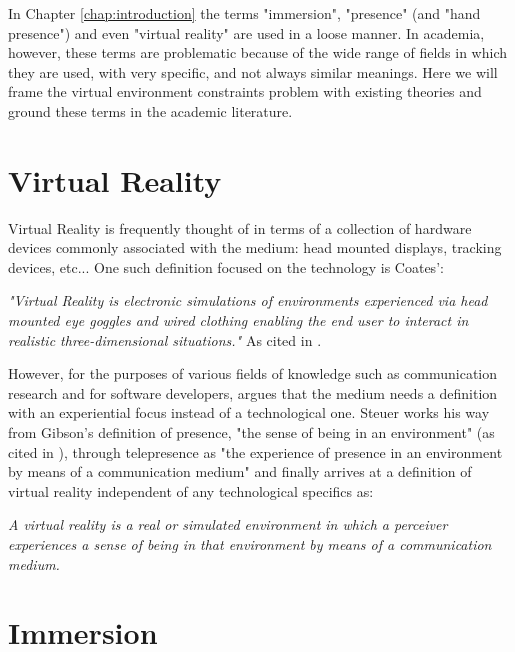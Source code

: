 In Chapter \ref{chap:introduction} the terms "immersion", "presence" (and "hand presence") and even "virtual reality" are used in a loose manner. In academia, however, these terms are problematic because of the wide range of fields in which they are used, with very specific, and not always similar meanings. Here we will frame the virtual environment constraints problem with existing theories and ground these terms in the academic literature.

\section{Virtual Reality}
\label{sec:vrDef}

Virtual Reality is frequently thought of in terms of a collection of hardware devices commonly associated with the medium: head mounted displays, tracking devices, etc... One such definition focused on the technology is Coates':

\begin{displayquote}
\textit{"Virtual Reality is electronic simulations of environments experienced via head mounted eye goggles and wired clothing enabling the end user to interact in realistic three-dimensional situations."} As cited in \parencite{Steuer1992}.
\end{displayquote}

However, for the purposes of various fields of knowledge such as communication research and for software developers, \parencite{Steuer1992} argues that the medium needs a definition with an experiential focus instead of a technological one. Steuer works his way from Gibson's definition of presence, "the sense of being in an environment" (as cited in \parencite{Steuer1992}), through telepresence as "the experience of presence in an environment by means of a communication medium" \parencite{Steuer1992} and finally arrives at a definition of virtual reality independent of any technological specifics as:

\begin{displayquote}
\textit{A virtual reality is a real or simulated environment in which a perceiver experiences a sense of being in that environment by means of a communication medium.} \parencite{Steuer1992}
\end{displayquote}

\section{Immersion}
\label{sec:immersion}

